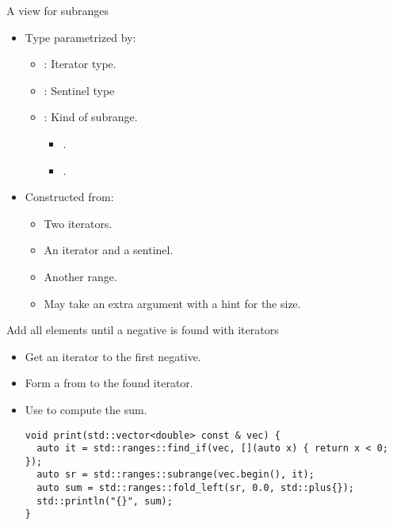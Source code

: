 \begin{frame}[t,fragile]{A view for subranges}
\begin{itemize}
  \item Type  parametrized by:
    \begin{itemize}
      \item {}: Iterator type.
      \item {}: Sentinel type
      \item {}: Kind of subrange.
        \begin{itemize}
          \item {}.
          \item {}.
        \end{itemize}    
    \end{itemize}

  \item Constructed from:
    \begin{itemize}
      \item Two iterators.
      \item An iterator and a sentinel.
      \item Another range.
      \item May take an extra argument with a hint for the size.
    \end{itemize}
\end{itemize}
\end{frame}

\begin{frame}[t,fragile]{Add all elements until a negative is found with
iterators}
\begin{itemize}
  \item Get an iterator to the first negative.
  \item Form a  from  to the found iterator.
  \item Use  to compute the sum.

\begin{lstlisting}
void print(std::vector<double> const & vec) {
  auto it = std::ranges::find_if(vec, [](auto x) { return x < 0; });
  auto sr = std::ranges::subrange(vec.begin(), it);
  auto sum = std::ranges::fold_left(sr, 0.0, std::plus{});
  std::println("{}", sum);
}
\end{lstlisting}
\end{itemize}
\end{frame}

